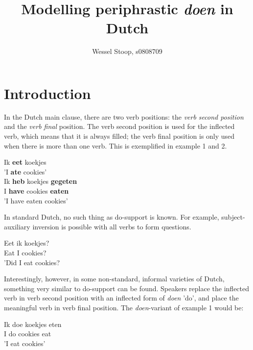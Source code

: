 \documentclass[12pt]{article}
\title{Modelling periphrastic \emph{doen} in Dutch}
\author{Wessel Stoop, s0808709}
\begin{document}
\maketitle

\section{Introduction}
In the Dutch main clause, there are two verb positions: the \emph{verb second position} and the \emph{verb final} position. The verb second position is used for the inflected verb, which means that it is always filled; the verb final position is only used when there is more than one verb. This is exemplified in example 1 and 2.

\begin{exe}
\ex \gll Ik \textbf{eet} koekjes\\
 'I \textbf{ate} cookies'\\

\ex \gll Ik \textbf{heb} koekjes \textbf{gegeten}\\
I \textbf{have} cookies \textbf{eaten}\\
\trans 'I have eaten cookies'
\end{exe}

In standard Dutch, no such thing as do-support is known. For example, subject-auxiliary inversion is possible with all verbs to form questions.

\begin{exe}
\ex \gll Eet ik koekjes? \\
Eat I cookies? \\
\trans 'Did I eat cookies?
\end{exe}

Interestingly, however, in some non-standard, informal varieties of Dutch, something very similar to do-support can be found. Speakers replace the inflected verb in verb second position with an inflected form of \emph{doen} 'do', and place the meaningful verb in verb final position. The \emph{doen}-variant of example 1 would be:

\begin{exe}
\ex \gll Ik doe koekjes eten \\
I do cookies eat\\
\trans 'I eat cookies'
\end{exe}
\end{document}
